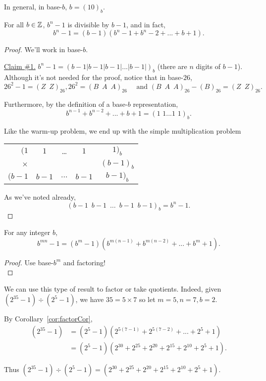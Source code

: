 \begin{proposition} In general, in base-$b$, $b=(10)_b$. \end{proposition}

\begin{proposition} For all $b \in \mathbb{Z}$, $b^n - 1$ is divisible by $b-1$, and in fact, 
$$b^n -1 = (b-1)(b^n-1 + b^n-2 + ... + b + 1).$$
\end{proposition}

\begin{proof} We'll work in base-$b$.

\underline{Claim \#1.} $b^n-1 = (b-1 | b-1 | b-1 |...| b-1 |)_b$ (there are $n$ digits of $b-1$).\\

Although it's not needed for the proof, notice that in base-$26$, 
\[26^2 -1 = (Z\,\,\,Z)_{26}, 26^2=(B\,\,\,A\,\,\,A)_{26} \quad \text{ and } (B\,\,\,A\,\,\,A)_{26} - (B)_{26} = (Z\,\,\,Z)_{26}.\]

Furthermore, by the definition of a base-$b$ representation,
\[b^{n-1} + b^{n-2} + ... + b + 1 = (1\,\,1...1\,\,1)_b.\]

Like the warm-up problem, we end up with the simple multiplication problem

\begin{center}
\begin{tabular}{r c c c c}
$(1$ & $1$ & \ldots & $1$ & $1)_{b}$\\
$\times$ & & & & $(b-1)_{b}$\\
\hline
$(b-1$ & $b-1$ & $\ldots$ & $b-1$ & $b-1)_{b}$
\end{tabular}
\end{center}

As we've noted already, 
\[ (b-1 \,\,\, b-1 \,\,\, \ldots \,\,\, b-1 \,\,\, b-1)_b = b^n -1.\]

\end{proof}

\begin{corollary}\label{cor:factorCor} For any integer $b$, \[b^{mn} - 1 = (b^{m}-1)(b^{m(n-1)} + b^{m(n-2)} +...+b^m + 1).\]
\end{corollary}

\begin{proof}
Use base-$b^m$ and factoring!\\
\end{proof}

\begin{example} We can use this type of result to factor or take quotients.  Indeed, given $(2^{35} - 1 ) \div (2^5 -1)$, we have $35 = 5 \times 7$ so let $m=5, n=7, b=2$.

By Corollary~\ref{cor:factorCor},
\begin{align*}
(2^{35}-1) &= (2^{5}-1)(2^{5(7-1)}+2^{5(7-2)}+...+2^5+1)\\
 &= (2^{5}-1)(2^{30}+2^{25}+2^{20}+2^{15}+2^{10}+2^5+1).
\end{align*}

Thus $(2^{35} - 1 ) \div (2^5 -1) = (2^{30}+2^{25}+2^{20}+2^{15}+2^{10}+2^5+1)$.
\end{example}

